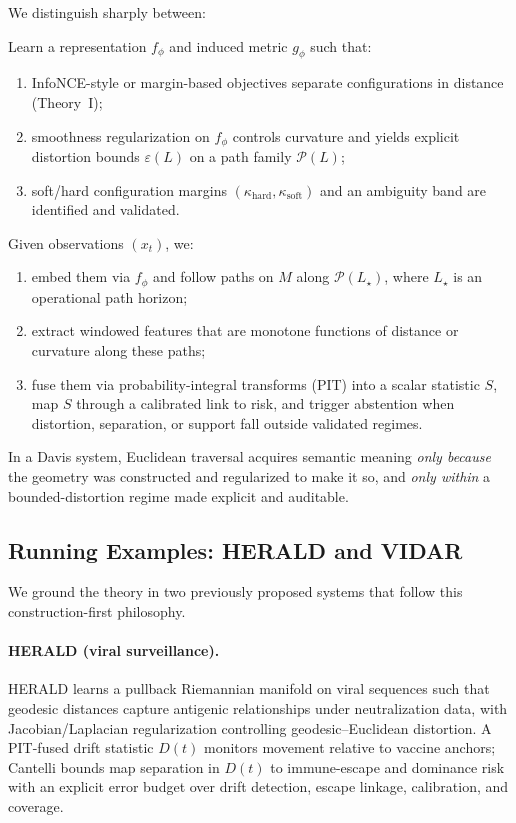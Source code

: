 \documentclass[11pt]{article}
\begin{document}
We distinguish sharply between:
\begin{description}[leftmargin=*,labelsep=0.6em]
    \item[Construction (training time).] Learn a representation $f_\phi$ and induced metric $g_\phi$ such that:
    \begin{enumerate}[leftmargin=1.5em]
        \item InfoNCE-style or margin-based objectives separate configurations in distance (Theory~I);
        \item smoothness regularization on $f_\phi$ controls curvature and yields explicit distortion bounds $\varepsilon(L)$ on a path family $\mathcal{P}(L)$;
        \item soft/hard configuration margins $(\kappa_{\text{hard}}, \kappa_{\text{soft}})$ and an ambiguity band are identified and validated.
    \end{enumerate}
    \item[Traversal (runtime).] Given observations $(x_t)$, we:
    \begin{enumerate}[leftmargin=1.5em]
        \item embed them via $f_\phi$ and follow paths on $M$ along $\mathcal{P}(L_\star)$, where $L_\star$ is an operational path horizon;
        \item extract windowed features that are monotone functions of distance or curvature along these paths;
        \item fuse them via probability-integral transforms (PIT) into a scalar statistic $S$, map $S$ through a calibrated link to risk, and trigger abstention when distortion, separation, or support fall outside validated regimes.
    \end{enumerate}
\end{description}
In a Davis system, Euclidean traversal acquires semantic meaning \emph{only because} the geometry was constructed and regularized to make it so, and \emph{only within} a bounded-distortion regime made explicit and auditable.

\subsection{Running Examples: HERALD and VIDAR}
\label{sec:running-examples}

We ground the theory in two previously proposed systems that follow this construction-first philosophy.

\paragraph{HERALD (viral surveillance).}
HERALD learns a pullback Riemannian manifold on viral sequences such that geodesic distances capture antigenic relationships under neutralization data, with Jacobian/Laplacian regularization controlling geodesic--Euclidean distortion. A PIT-fused drift statistic $D(t)$ monitors movement relative to vaccine anchors; Cantelli bounds map separation in $D(t)$ to immune-escape and dominance risk with an explicit error budget over drift detection, escape linkage, calibration, and coverage.
\end{document}
